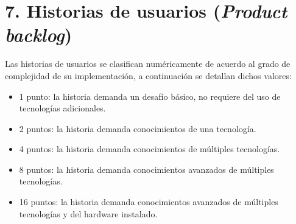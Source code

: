 \documentclass[
11pt%
]{charter}
\begin{document}
\begin{enumerate}
\begin{enumerate}
		\end{enumerate}
\end{enumerate}






\section{7. Historias de usuarios (\textit{Product backlog})}
\label{sec:backlog}



Las historias de usuarios se clasifican numéricamente de acuerdo al grado de complejidad de su implementación, a continuación se detallan dichos valores:

\begin{itemize}
	\item 1 punto: la historia demanda un desafío básico, no requiere del uso de tecnologías adicionales.
	\item 2 puntos: la historia demanda conocimientos de una tecnología.
	\item 4 puntos: la historia demanda conocimientos de múltiples tecnologías.
	\item 8 puntos: la historia demanda conocimientos avanzados de múltiples tecnologías.
	\item 16 puntos: la historia demanda conocimientos avanzados de múltiples tecnologías y del hardware instalado.
\end{itemize}
\end{document}
